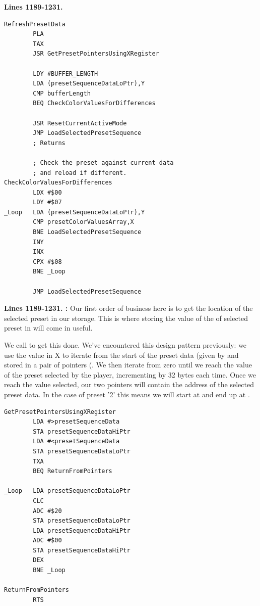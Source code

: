 \clearpage
\textbf{Lines 1189-1231. } 
\begin{lstlisting}
RefreshPresetData    
        PLA 
        TAX 
        JSR GetPresetPointersUsingXRegister

        LDY #BUFFER_LENGTH
        LDA (presetSequenceDataLoPtr),Y
        CMP bufferLength
        BEQ CheckColorValuesForDifferences

        JSR ResetCurrentActiveMode
        JMP LoadSelectedPresetSequence
        ; Returns

        ; Check the preset against current data
        ; and reload if different.
CheckColorValuesForDifferences   
        LDX #$00
        LDY #$07
_Loop   LDA (presetSequenceDataLoPtr),Y
        CMP presetColorValuesArray,X
        BNE LoadSelectedPresetSequence
        INY 
        INX 
        CPX #$08
        BNE _Loop

        JMP LoadSelectedPresetSequence

\end{lstlisting}
\clearpage


\textbf{Lines 1189-1231. :} Our first order of business here is to get the location of the selected preset
in our storage. This is where storing the value of the of selected preset in  will come in useful. 

We call  to get this done. We've encountered this design pattern 
previously: we use the value in X to iterate from the start of the preset data (given by  and stored in a pair of pointers
(. We then iterate from zero until we reach the value of the preset selected by the player, 
incrementing  by 32 bytes each time. Once we reach the value selected, our two pointers will contain the address
of the selected preset data. In the case of preset '2' this means we will start at  and end up at .
\begin{lstlisting}
GetPresetPointersUsingXRegister   
        LDA #>presetSequenceData
        STA presetSequenceDataHiPtr
        LDA #<presetSequenceData
        STA presetSequenceDataLoPtr
        TXA 
        BEQ ReturnFromPointers

_Loop   LDA presetSequenceDataLoPtr
        CLC 
        ADC #$20
        STA presetSequenceDataLoPtr
        LDA presetSequenceDataHiPtr
        ADC #$00
        STA presetSequenceDataHiPtr
        DEX 
        BNE _Loop

ReturnFromPointers   
        RTS 
\end{lstlisting}


